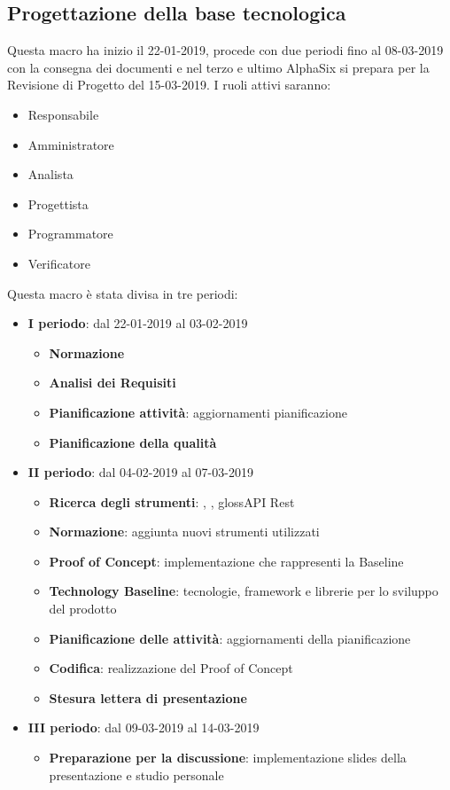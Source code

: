         \subsection{Progettazione della base tecnologica}
        	Questa macro ha inizio il 22-01-2019, procede con due periodi fino al 08-03-2019 con la consegna dei documenti e nel
        terzo e ultimo AlphaSix si prepara per la Revisione di Progetto del 15-03-2019. I ruoli attivi saranno: 
        \begin{itemize}
            \item Responsabile
            \item Amministratore
            \item Analista
            \item Progettista
            \item Programmatore
            \item Verificatore
        \end{itemize}
        Questa macro è stata divisa in tre periodi:
		\begin{itemize}
			\item \textbf{I periodo}: dal 22-01-2019 al 03-02-2019
			\begin{itemize}
    	        \item \textbf{Normazione}
    	        \item \textbf{Analisi dei Requisiti}
    	        \item \textbf{Pianificazione attività}: aggiornamenti pianificazione
    	        \item \textbf{Pianificazione della qualità}
        	\end{itemize}
			\item \textbf{II periodo}: dal 04-02-2019 al 07-03-2019
			\begin{itemize}
				\item \textbf{Ricerca degli strumenti}: , , gloss{API Rest} 
    	        \item \textbf{Normazione}: aggiunta nuovi strumenti utilizzati
    	        \item \textbf{Proof of Concept}: implementazione che rappresenti la Baseline
    	        \item \textbf{Technology Baseline}: tecnologie, framework e librerie per lo sviluppo del prodotto
    	        \item \textbf{Pianificazione delle attività}: aggiornamenti della pianificazione
    	        \item \textbf{Codifica}: realizzazione del Proof of Concept
    	        \item \textbf{Stesura lettera di presentazione}
        	\end{itemize}
        	\item \textbf{III periodo}: dal 09-03-2019 al 14-03-2019
			\begin{itemize}
				\item \textbf{Preparazione per la discussione}: implementazione slides della presentazione e studio personale
        	\end{itemize}
		\end{itemize}
        
